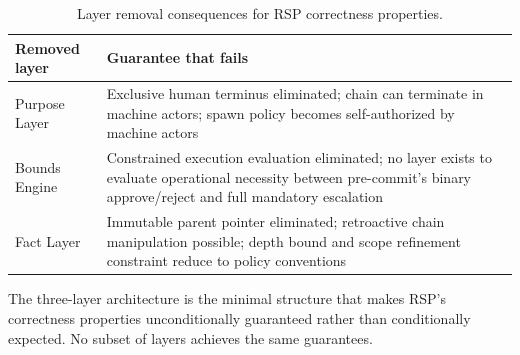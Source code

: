 \begin{table}[h]
\centering
\begin{tabular}{p{3.0cm} p{5.2cm}}
\toprule
\textbf{Removed layer} & \textbf{Guarantee that fails} \\
\midrule
Purpose Layer & Exclusive human terminus eliminated; chain can terminate in machine actors; spawn policy becomes self-authorized by machine actors \\
Bounds Engine & Constrained execution evaluation eliminated; no layer exists to evaluate operational necessity between pre-commit's binary approve/reject and full mandatory escalation \\
Fact Layer & Immutable parent pointer eliminated; retroactive chain manipulation possible; depth bound and scope refinement constraint reduce to policy conventions \\
\bottomrule
\end{tabular}
\caption{Layer removal consequences for RSP correctness properties.}
\label{tab:layer-minimality}
\end{table}

The three-layer architecture is the minimal structure that makes RSP's correctness properties unconditionally guaranteed rather than conditionally expected. No subset of layers achieves the same guarantees.